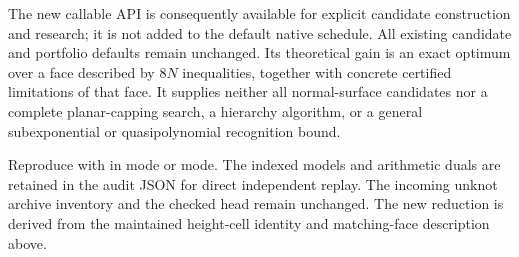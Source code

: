The new callable  API is consequently
available for explicit candidate construction and research; it is not added
to the default native schedule. All existing candidate and portfolio defaults
remain unchanged. Its theoretical gain is an exact optimum over a face described by $8N$
inequalities, together with concrete certified limitations of that face. It supplies neither all normal-surface candidates
nor a complete planar-capping search, a hierarchy algorithm, or a general
subexponential or quasipolynomial recognition bound.

Reproduce with  in  mode or
 mode. The indexed models and arithmetic duals
are retained in the audit JSON for direct independent replay. The incoming
unknot archive inventory and the checked  head
 remain unchanged. The new reduction is derived from the
maintained height-cell identity and matching-face description above.
